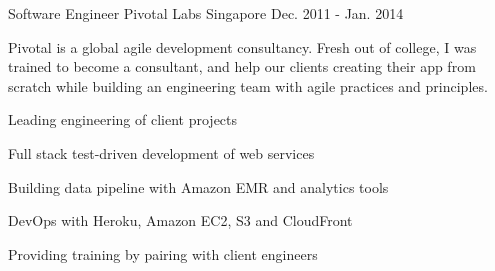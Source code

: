 \begin{cventries}
  \cventry
    {Software Engineer} %
    {Pivotal Labs} %
    {Singapore} %
    {Dec. 2011 - Jan. 2014} %
    {
      Pivotal is a global agile development consultancy. Fresh out of college, I was trained to become a consultant, and help our clients creating their app from scratch while building an engineering team with agile practices and principles.
      \begin{cvitems} %
        \item Leading engineering of client projects
        \item Full stack test-driven development of web services
        \item Building data pipeline with Amazon EMR and analytics tools
        \item DevOps with Heroku, Amazon EC2, S3 and CloudFront
        \item Providing training by pairing with client engineers
      \end{cvitems}
    }
\end{cventries}
